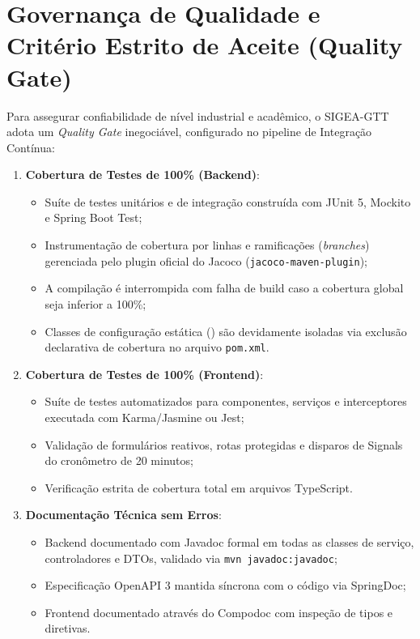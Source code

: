 \section{Governança de Qualidade e Critério Estrito de Aceite (Quality Gate)}
\label{sec_quality_gate}

Para assegurar confiabilidade de nível industrial e acadêmico, o SIGEA-GTT adota um \textit{Quality Gate} inegociável, configurado no pipeline de Integração Contínua:

\begin{enumerate}
    \item \textbf{Cobertura de Testes de 100\% (Backend)}:
    \begin{itemize}
        \item Suíte de testes unitários e de integração construída com JUnit 5, Mockito e Spring Boot Test;
        \item Instrumentação de cobertura por linhas e ramificações (\textit{branches}) gerenciada pelo plugin oficial do Jacoco (\texttt{jacoco-maven-plugin});
        \item A compilação é interrompida com falha de build caso a cobertura global seja inferior a 100\%;
        \item Classes de configuração estática () são devidamente isoladas via exclusão declarativa de cobertura no arquivo \texttt{pom.xml}.
    \end{itemize}

    \item \textbf{Cobertura de Testes de 100\% (Frontend)}:
    \begin{itemize}
        \item Suíte de testes automatizados para componentes, serviços e interceptores executada com Karma/Jasmine ou Jest;
        \item Validação de formulários reativos, rotas protegidas e disparos de Signals do cronômetro de 20 minutos;
        \item Verificação estrita de cobertura total em arquivos TypeScript.
    \end{itemize}

    \item \textbf{Documentação Técnica sem Erros}:
    \begin{itemize}
        \item Backend documentado com Javadoc formal em todas as classes de serviço, controladores e DTOs, validado via \texttt{mvn javadoc:javadoc};
        \item Especificação OpenAPI 3 mantida síncrona com o código via SpringDoc;
        \item Frontend documentado através do Compodoc com inspeção de tipos e diretivas.
    \end{itemize}
\end{enumerate}
